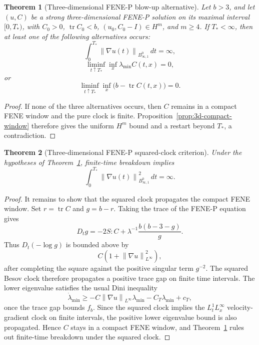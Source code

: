 \documentclass[11pt]{article}
\newtheorem{theorem}{Theorem}[section]
\newcommand{\tr}{\operatorname{tr}}
\newcommand{\norm}[1]{\left\lVert #1\right\rVert}
\newcommand{\Besov}{B^0_{\infty,1}}
\begin{document}
\begin{theorem}[Three-dimensional FENE-P blow-up alternative]
\label{thm:3d-fene-alternative}
Let \(b>3\), and let \((u,C)\) be a strong three-dimensional FENE-P solution on
its maximal interval \([0,T_*)\), with \(C_0>0\), \(\tr C_0<b\),
\((u_0,C_0-I)\in H^m\), and \(m\ge4\).  If \(T_*<\infty\), then at least one of the following
alternatives occurs:
\[
  \int_0^{T_*}\norm{\nabla u(t)}_{\Besov}\,dt=\infty,
\]
\[
  \liminf_{t\uparrow T_*}\inf_x\lambda_{\min}C(t,x)=0,
\]
or
\[
  \liminf_{t\uparrow T_*}\inf_x\bigl(b-\tr C(t,x)\bigr)=0 .
\]
\end{theorem}

\begin{proof}
If none of the three alternatives occurs, then \(C\) remains in a compact FENE
window and the pure clock is finite.  Proposition~\ref{prop:3d-compact-window}
therefore gives the uniform \(H^m\) bound and a restart beyond \(T_*\), a
contradiction.
\end{proof}

\begin{theorem}[Three-dimensional FENE-P squared-clock criterion]
\label{thm:3d-fene-square-clock}
Under the hypotheses of Theorem~\ref{thm:3d-fene-alternative}, finite-time
breakdown implies
\[
  \int_0^{T_*}\norm{\nabla u(t)}_{\Besov}^2\,dt=\infty .
\]
\end{theorem}

\begin{proof}
It remains to show that the squared clock propagates the compact FENE window.
Set \(r=\tr C\) and \(g=b-r\).  Taking the trace of the FENE-P equation gives
\[
  D_tg=-2S:C+\lambda^{-1}\frac{b(b-3-g)}{g}.
\]
Thus \(D_t(-\log g)\) is bounded above by
\[
  C\left(1+\norm{\nabla u}_{L^\infty}^2\right),
\]
after completing the square against the positive singular term \(g^{-2}\).
The squared Besov clock therefore propagates a positive trace gap on finite
time intervals.  The lower eigenvalue satisfies the usual Dini inequality
\[
  \dot\lambda_{\min}\ge
  -C\norm{\nabla u}_{L^\infty}\lambda_{\min}-C_T\lambda_{\min}+c_T,
\]
once the trace gap bounds \(f_b\).  Since the squared clock implies the
\(L^1_tL^\infty_x\) velocity-gradient clock on finite intervals, the positive
lower eigenvalue bound is also propagated.  Hence \(C\) stays in a compact
FENE window, and Theorem~\ref{thm:3d-fene-alternative} rules out finite-time
breakdown under the squared clock.
\end{proof}
\end{document}
